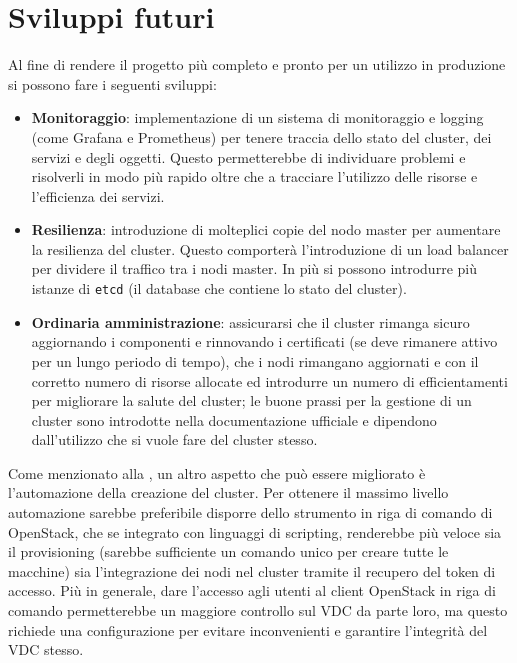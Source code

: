 \documentclass[12pt,a4paper,openright,twoside]{book}
\begin{document}
\section{Sviluppi futuri}
\label{sec:future}
Al fine di rendere il progetto più completo e pronto per un utilizzo in produzione si possono fare i seguenti sviluppi:
\begin{itemize}
    \item {\textbf{Monitoraggio}: implementazione di un sistema di monitoraggio e logging (come Grafana e Prometheus) per tenere traccia dello stato del cluster, dei servizi e degli oggetti.
    Questo permetterebbe di individuare problemi e risolverli in modo più rapido oltre che a tracciare l'utilizzo delle risorse e l'efficienza dei servizi.
    }
    \item{
        \textbf{Resilienza}: introduzione di molteplici copie del nodo master per aumentare la resilienza del cluster. Questo comporterà l'introduzione di un load balancer per dividere il traffico tra i nodi master.
        In più si possono introdurre più istanze di \texttt{etcd} (il database che contiene lo stato del cluster)\cite{kubernetes}.
    }
    \item {
        \textbf{Ordinaria amministrazione}: assicurarsi che il cluster rimanga sicuro aggiornando i componenti e rinnovando i certificati (se deve rimanere
        attivo per un lungo periodo di tempo), che i nodi rimangano aggiornati e con il corretto numero di risorse allocate ed introdurre un numero di efficientamenti
        per migliorare la salute del cluster; le buone prassi per la gestione di un cluster sono introdotte nella documentazione ufficiale e dipendono dall'utilizzo che
        si vuole fare del cluster stesso\cite{kubernetes}.
    }
\end{itemize}
Come menzionato alla , un altro aspetto che può essere migliorato è l'automazione della creazione del cluster.
Per ottenere il massimo livello automazione sarebbe preferibile disporre dello strumento in riga di comando di OpenStack, che se integrato con linguaggi di scripting, renderebbe 
più veloce sia il provisioning (sarebbe sufficiente un comando unico per creare tutte le macchine) sia l'integrazione dei nodi nel cluster tramite il recupero del token di accesso.
Più in generale, dare l'accesso agli utenti al client OpenStack in riga di comando permetterebbe un maggiore controllo sul VDC da parte loro, ma questo richiede una configurazione
per evitare inconvenienti e garantire l'integrità del VDC stesso.
\end{document}
